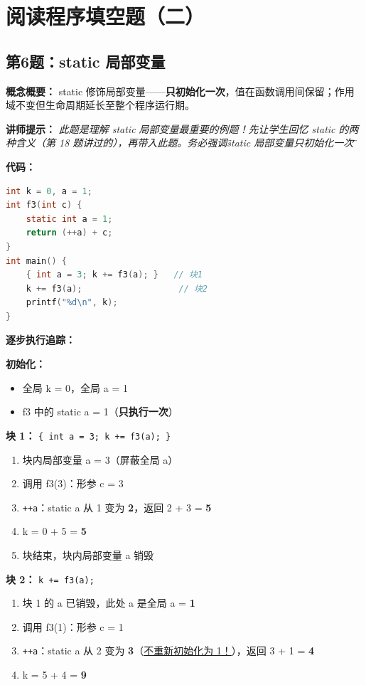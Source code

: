 \section{阅读程序填空题（二）}

\subsection{第6题：static 局部变量}

\textbf{概念概要：} static 修饰局部变量——\textbf{只初始化一次}，值在函数调用间保留；作用域不变但生命周期延长至整个程序运行期。

\medskip
\textbf{讲师提示：} \textit{此题是理解 static 局部变量最重要的例题！先让学生回忆 static 的两种含义（第 18 题讲过的），再带入此题。务必强调\"static 局部变量只初始化一次\"。}

\smallskip
\textbf{代码：}
\begin{lstlisting}[language=C]
int k = 0, a = 1;
int f3(int c) {
    static int a = 1;
    return (++a) + c;
}
int main() {
    { int a = 3; k += f3(a); }   // 块1
    k += f3(a);                   // 块2
    printf("%d\n", k);
}
\end{lstlisting}

\smallskip
\textbf{逐步执行追踪：}

\noindent \textbf{初始化：}
\begin{itemize}
    \item 全局 k = 0，全局 a = 1
    \item f3 中的 static a = 1（\textbf{只执行一次}）
\end{itemize}

\noindent \textbf{块 1：} \texttt{\{ int a = 3; k += f3(a); \}}
\begin{enumerate}
    \item 块内局部变量 a = 3（屏蔽全局 a）
    \item 调用 f3(3)：形参 c = 3
    \item \texttt{++a}：static a 从 1 变为 \textbf{2}，返回 2 + 3 = \textbf{5}
    \item k = 0 + 5 = \textbf{5}
    \item 块结束，块内局部变量 a 销毁
\end{enumerate}

\noindent \textbf{块 2：} \texttt{k += f3(a);}
\begin{enumerate}
    \item 块 1 的 a 已销毁，此处 a 是全局 a = \textbf{1}
    \item 调用 f3(1)：形参 c = 1
    \item \texttt{++a}：static a 从 2 变为 \textbf{3}（\underline{不重新初始化为 1！}），返回 3 + 1 = \textbf{4}
    \item k = 5 + 4 = \textbf{9}
\end{enumerate}

